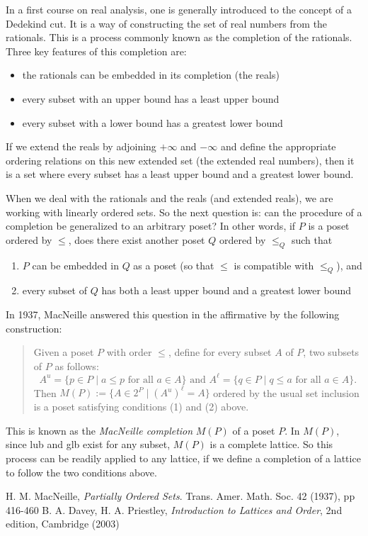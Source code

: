 \documentclass[12pt]{article}
\begin{document}
In a first course on real analysis, one is generally introduced to the concept of a Dedekind cut.  It is a way of constructing the set of real numbers from the rationals.  This is a process commonly known as the completion of the rationals.  Three key features of this completion are:
\begin{itemize}
\item the rationals can be embedded in its completion (the reals)
\item every subset with an upper bound has a least upper bound
\item every subset with a lower bound has a greatest lower bound
\end{itemize}

If we extend the reals by adjoining $+\infty$ and $-\infty$ and define the appropriate ordering relations on this new extended set (the extended real numbers), then it is a set where every subset has a least upper bound and a greatest lower bound.

When we deal with the rationals and the reals (and extended reals), we are working with linearly ordered sets.  So the next question is: can the procedure of a completion be generalized to an arbitrary poset?  In other words, if $P$ is a poset ordered by $\le$, does there exist another poset $Q$ ordered by $\le_Q$ such that 
\begin{enumerate}
\item $P$ can be embedded in $Q$ as a poset (so that $\le$ is compatible with $\le_Q$), and
\item every subset of $Q$ has both a least upper bound and a greatest lower bound
\end{enumerate}

In 1937, MacNeille answered this question in the affirmative by the following construction:

\begin{quote}
Given a poset $P$ with order $\le$, define for every subset $A$ of $P$, two subsets of $P$ as follows: 
$$A^u=\lbrace p\in P\mid a\le p\mbox{ for all }a\in A\rbrace\mbox{ and }A^{\ell}=\lbrace q\in P\mid q\le a\mbox{ for all }a\in A\rbrace.$$
Then $M(P):=\lbrace A\in 2^P \mid (A^u)^{\ell}=A\rbrace$ ordered by the usual set inclusion is a poset satisfying conditions (1) and (2) above.
\end{quote}

This is known as the \emph{MacNeille completion} $M(P)$ of a poset $P$.  In $M(P)$, since lub and glb exist for any subset, $M(P)$ is a complete lattice.  So this process can be readily applied to any lattice, if we define a completion of a lattice to follow the two conditions above.

\begin{thebibliography}{8}
 H. M. MacNeille, {\it Partially Ordered Sets}. Trans. Amer. Math. Soc. 42 (1937), pp 416-460
 B. A. Davey, H. A. Priestley, {\it Introduction to Lattices and Order}, 2nd edition, Cambridge (2003)
\end{thebibliography}
\end{document}

